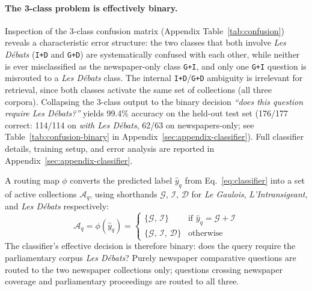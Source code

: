 \paragraph{The 3-class problem is effectively binary.}
Inspection of the 3-class confusion matrix (Appendix Table~\ref{tab:confusion}) reveals a characteristic error
structure: the two classes that both involve \textit{Les Débats} (\texttt{I+D}
and \texttt{G+D}) are systematically confused with each other, while neither
is ever misclassified as the newspaper-only class \texttt{G+I}, and only one
\texttt{G+I} question is misrouted to a \textit{Les Débats} class.
The internal \texttt{I+D}/\texttt{G+D} ambiguity is irrelevant for retrieval,
since both classes activate the same set of collections (all three corpora).
Collapsing the 3-class output to the binary decision \emph{``does this question
require \textit{Les Débats}?''} yields 99.4\% accuracy on the held-out
test set (176/177 correct: 114/114 on \textit{with Les Débats}, 62/63 on
newspapers-only; see Table~\ref{tab:confusion-binary} in
Appendix~\ref{sec:appendix-classifier}).
Full classifier details, training setup, and error analysis are reported in
Appendix~\ref{sec:appendix-classifier}.

A routing map $\phi$ converts the predicted label $\hat{y}_q$ from
Eq.~\ref{eq:classifier} into a set of active collections
$\mathcal{A}_q$, using shorthands $\mathcal{G}$, $\mathcal{I}$,
$\mathcal{D}$ for \textit{Le Gaulois}, \textit{L'Intransigeant}, and
\textit{Les Débats} respectively:
%
\begin{equation}
  \label{eq:routing}
  \mathcal{A}_q = \phi(\hat{y}_q) =
  \begin{cases}
    \{\mathcal{G},\, \mathcal{I}\}
      & \text{if } \hat{y}_q = \mathcal{G} + \mathcal{I} \\[4pt]
    \{\mathcal{G},\, \mathcal{I},\, \mathcal{D}\}
      & \text{otherwise}
  \end{cases}
\end{equation}
%
The classifier's effective decision is therefore binary: does the query require
the parliamentary corpus \textit{Les Débats}? Purely newspaper comparative
questions are routed to the two newspaper collections only; questions crossing
newspaper coverage and parliamentary proceedings are routed to all three.


